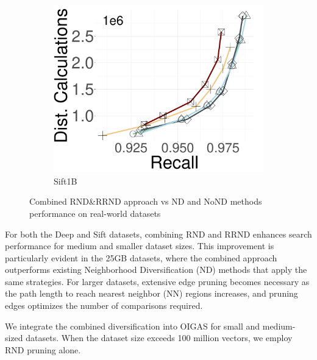 \begin{figure}[ht]
  \hspace{0.4cm}
		\begin{subfigure}{0.28\columnwidth}
			\centering
			\captionsetup{justification=centering}	
			\includegraphics[width=\textwidth]{../img/oigas/RND_RRND/DC_SIFT1B.pdf}
   \caption{{Sift1B}}
		\label{fig:ND:sift1b}
		\end{subfigure}	
		\caption{{Combined RND\&RRND approach vs ND and NoND methods performance on real-world datasets}}
		\label{fig:ND:search:real}
 \end{figure}
 
For both the Deep and Sift datasets, combining RND and RRND enhances search performance for medium and smaller dataset sizes. This improvement is particularly evident in the 25GB datasets, where the combined approach outperforms existing Neighborhood Diversification (ND) methods that apply the same strategies. For larger datasets, extensive edge pruning becomes necessary as the path length to reach nearest neighbor (NN) regions increases, and pruning edges optimizes the number of comparisons required.

We integrate the combined diversification into OIGAS for small and medium-sized datasets. When the dataset size exceeds 100 million vectors, we employ RND pruning alone.


